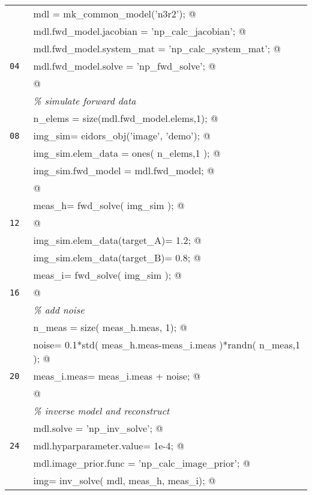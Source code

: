 \documentclass[12pt]{iopart}
\makeatletter
\newcommand{\CN}{\tt\small} %
\newcommand{\CC}{&\verb@}   % start code
\newcommand{\CI}{&\it}   % start code
\makeatother
\begin{document}
\begin{tabular}{ll}
\CN    \CC mdl  = mk_common_model('n3r2');   @\\
\CN    \CC mdl.fwd_model.jacobian   = 'np_calc_jacobian';   @\\
\CN    \CC mdl.fwd_model.system_mat = 'np_calc_system_mat';   @\\
\CN 04 \CC mdl.fwd_model.solve      = 'np_fwd_solve';   @\\
\CN    \CC @\\
\CN    \CI \% simulate forward data \\
\CN    \CC n_elems = size(mdl.fwd_model.elems,1);   @\\
\CN 08 \CC img_sim= eidors_obj('image', 'demo');   @\\
\CN    \CC img_sim.elem_data = ones( n_elems,1 );    @\\
\CN    \CC img_sim.fwd_model = mdl.fwd_model;   @\\
\CN    \CC @\\
\CN    \CC meas_h= fwd_solve( img_sim );   @\\
\CN 12 \CC @\\
\CN    \CC img_sim.elem_data(target_A)= 1.2;   @\\
\CN    \CC img_sim.elem_data(target_B)= 0.8;   @\\
\CN    \CC meas_i= fwd_solve( img_sim );   @\\
\CN 16 \CC @\\
\CN    \CI \% add noise \\
\CN    \CC n_meas = size( meas_h.meas, 1); @\\
\CN    \CC noise= 0.1*std( meas_h.meas-meas_i.meas )*randn( n_meas,1 ); @\\
\CN 20 \CC meas_i.meas= meas_i.meas + noise; @\\
\CN    \CC @\\
\CN    \CI \% inverse model and reconstruct\\
\CN    \CC mdl.solve               = 'np_inv_solve'; @\\
\CN 24 \CC mdl.hyparparameter.value= 1e-4; @\\
\CN    \CC mdl.image_prior.func    = 'np_calc_image_prior'; @\\
\CN    \CC img= inv_solve( mdl, meas_h, meas_i); @\\
\end{tabular}

%
%
\begin{figure}[th]
\end{figure}
\end{document}
